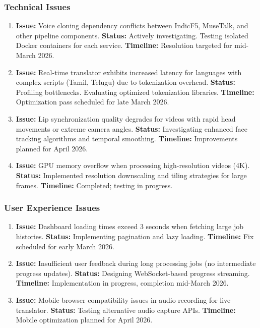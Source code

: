 \documentclass[12pt,oneside]{report}
\begin{document}
\subsubsection{Technical Issues}

\begin{enumerate}
    \item \textbf{Issue:} Voice cloning dependency conflicts between IndicF5, MuseTalk, and other pipeline components.  
    \textbf{Status:} Actively investigating. Testing isolated Docker containers for each service.  
    \textbf{Timeline:} Resolution targeted for mid-March 2026.
    
    \item \textbf{Issue:} Real-time translator exhibits increased latency for languages with complex scripts (Tamil, Telugu) due to tokenization overhead.  
    \textbf{Status:} Profiling bottlenecks. Evaluating optimized tokenization libraries.  
    \textbf{Timeline:} Optimization pass scheduled for late March 2026.
    
    \item \textbf{Issue:} Lip synchronization quality degrades for videos with rapid head movements or extreme camera angles.  
    \textbf{Status:} Investigating enhanced face tracking algorithms and temporal smoothing.  
    \textbf{Timeline:} Improvements planned for April 2026.
    
    \item \textbf{Issue:} GPU memory overflow when processing high-resolution videos (4K).  
    \textbf{Status:} Implemented resolution downscaling and tiling strategies for large frames.  
    \textbf{Timeline:} Completed; testing in progress.
\end{enumerate}

\subsubsection{User Experience Issues}

\begin{enumerate}
    \item \textbf{Issue:} Dashboard loading times exceed 3 seconds when fetching large job histories.  
    \textbf{Status:} Implementing pagination and lazy loading.  
    \textbf{Timeline:} Fix scheduled for early March 2026.
    
    \item \textbf{Issue:} Insufficient user feedback during long processing jobs (no intermediate progress updates).  
    \textbf{Status:} Designing WebSocket-based progress streaming.  
    \textbf{Timeline:} Implementation in progress, completion mid-March 2026.
    
    \item \textbf{Issue:} Mobile browser compatibility issues in audio recording for live translator.  
    \textbf{Status:} Testing alternative audio capture APIs.  
    \textbf{Timeline:} Mobile optimization planned for April 2026.
\end{enumerate}
\end{document}
